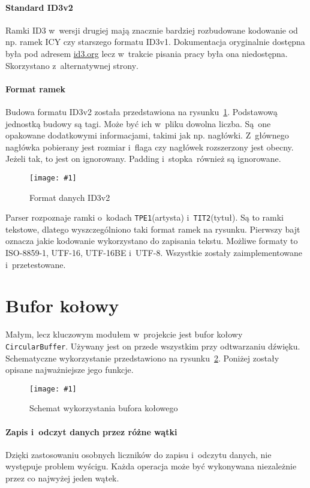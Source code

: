\documentclass[polish]{aghengthesis}
\newcommand{\imgint}[4]{
	\begin{figure}[{#4}]
		\centering
		\texttt{[image: \#1]}
		\caption{#2}
		\label{#1}
	\end{figure}
}
\newcommand{\imgh}[3]{\imgint{#1}{#2}{#3}{H}}
\begin{document}
			\paragraph{Standard ID3v2}
			Ramki ID3 w~wersji drugiej mają znacznie bardziej rozbudowane kodowanie od np. ramek ICY czy starszego formatu ID3v1. Dokumentacja oryginalnie dostępna była pod adresem \href{id3.org}{id3.org} lecz w~trakcie pisania pracy była ona niedostępna. Skorzystano z~alternatywnej strony\textsuperscript{\cite{id3_spec_mutagen}}.
			
			\paragraph{Format ramek}
			Budowa formatu ID3v2 została przedstawiona na rysunku~\ref{3/PicoRadio-id3}. Podstawową jednostką budowy są tagi. Może być ich w~pliku dowolna liczba. Są one opakowane dodatkowymi informacjami, takimi jak np. nagłówki. Z~głównego nagłówka pobierany jest rozmiar i~flaga czy nagłówek rozszerzony jest obecny. Jeżeli tak, to jest on ignorowany. Padding i~stopka również są ignorowane.
			
			\imgh{3/PicoRadio-id3}{Format danych ID3v2}{0.8}
			
			Parser rozpoznaje ramki o~kodach \lstinline|TPE1|(artysta) i~\lstinline|TIT2|(tytuł). Są to ramki tekstowe, dlatego wyszczególniono taki format ramek na rysunku. Pierwszy bajt oznacza jakie kodowanie wykorzystano do zapisania tekstu. Możliwe formaty to ISO-8859-1, UTF-16, UTF-16BE i~UTF-8. Wszystkie zostały zaimplementowane i~przetestowane.
	
	\section{Bufor kołowy}
		\label{sec:circular_buffer}
		Małym, lecz kluczowym modułem w~projekcie jest bufor kołowy \lstinline|CircularBuffer|. Używany jest on przede wszystkim przy odtwarzaniu dźwięku. Schematyczne wykorzystanie przedstawiono na rysunku~\ref{3/PicoRadio-buffer}. Poniżej zostały opisane najważniejsze jego funkcje.
		
		\imgh{3/PicoRadio-buffer}{Schemat wykorzystania bufora kołowego}{0.8}
		
		\paragraph{Zapis i~odczyt danych przez różne wątki}
			Dzięki zastosowaniu osobnych liczników do zapisu i~odczytu danych, nie występuje problem wyścigu. Każda operacja może być wykonywana niezależnie przez co najwyżej jeden wątek.
			
\end{document}
